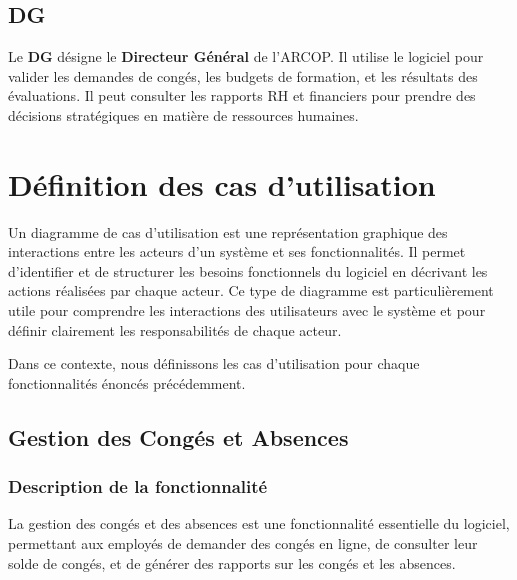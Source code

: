 \subsection{DG}
Le \textbf{DG} désigne le \textbf{Directeur Général} de l'ARCOP. Il utilise le logiciel pour valider les demandes de congés, les budgets de formation, et les résultats des évaluations. Il peut consulter les rapports RH et financiers pour prendre des décisions stratégiques en matière de ressources humaines.


\section{D\'efinition des cas d'utilisation}

Un diagramme de cas d'utilisation est une représentation graphique des interactions entre les acteurs d'un système et ses fonctionnalités. Il permet d'identifier et de structurer les besoins fonctionnels du logiciel en décrivant les actions réalisées par chaque acteur. Ce type de diagramme est particulièrement utile pour comprendre les interactions des utilisateurs avec le système et pour définir clairement les responsabilités de chaque acteur.

Dans ce contexte, nous définissons les cas d'utilisation pour chaque fonctionnalités énoncés précédemment.
\subsection{Gestion des Congés et Absences}
\subsubsection{Description de la fonctionnalité}
La gestion des congés et des absences est une fonctionnalité essentielle du logiciel, permettant aux employés de demander des congés en ligne, de consulter leur solde de congés, et de générer des rapports sur les congés et les absences.
